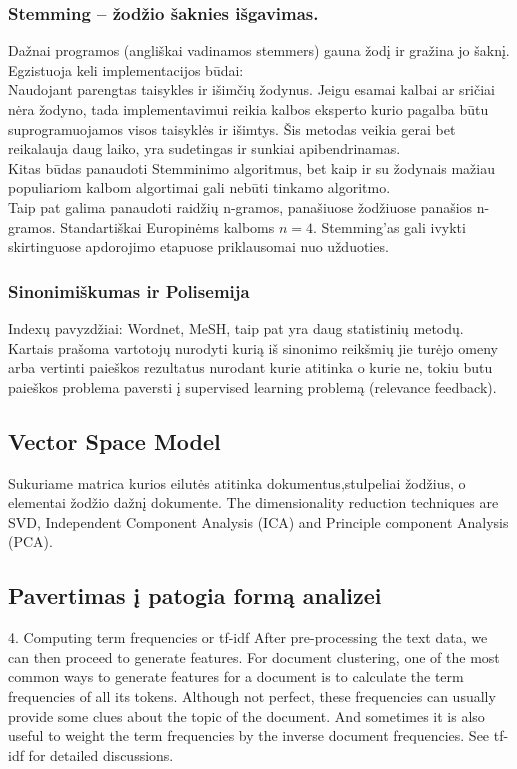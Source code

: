 \documentclass[draft]{VUMIFInfKursinis}
\begin{document}
\subsubsection{Stemming – žodžio šaknies išgavimas.}
Dažnai programos (angliškai vadinamos stemmers) gauna žodį ir gražina jo šaknį. Egzistuoja keli implementacijos būdai: \\
Naudojant parengtas taisykles ir išimčių žodynus. Jeigu esamai kalbai ar sričiai nėra žodyno, tada implementavimui reikia kalbos eksperto kurio pagalba būtu suprogramuojamos visos taisyklės ir išimtys. Šis metodas veikia gerai bet reikalauja daug laiko, yra sudetingas ir sunkiai apibendrinamas.
\\Kitas būdas panaudoti Stemminimo algoritmus, bet kaip ir su žodynais mažiau populiariom kalbom algortimai gali nebūti tinkamo algoritmo. 
\\Taip pat galima panaudoti raidžių n-gramos, panašiuose žodžiuose panašios n-gramos. Standartiškai Europinėms kalboms $n = 4$. Stemming’as gali ivykti skirtinguose apdorojimo etapuose priklausomai nuo užduoties.

\subsubsection{Sinonimiškumas ir Polisemija}
Indexų pavyzdžiai: Wordnet, MeSH, taip pat yra daug statistinių metodų. Kartais prašoma vartotojų nurodyti kurią iš sinonimo reikšmių jie turėjo omeny arba vertinti paieškos rezultatus nurodant kurie atitinka o kurie ne, tokiu butu paieškos problema paversti į supervised learning problemą (relevance feedback).

\subsection{Vector Space Model}
Sukuriame matrica kurios eilutės atitinka dokumentus,stulpeliai žodžius, o elementai žodžio dažnį dokumente.
The dimensionality reduction techniques are SVD, Independent Component Analysis (ICA) and Principle component Analysis (PCA). 
\subsection{Pavertimas į patogia formą analizei}
4. Computing term frequencies or  tf-idf
After pre-processing the text data, we can then proceed to generate features. For document clustering, one of the most common ways to generate features for a document is to calculate the term frequencies of all its tokens. Although not perfect, these frequencies can usually provide some clues about the topic of the document. And sometimes it is also useful to weight the term frequencies by the inverse document frequencies. See tf-idf for detailed discussions.
\end{document}
